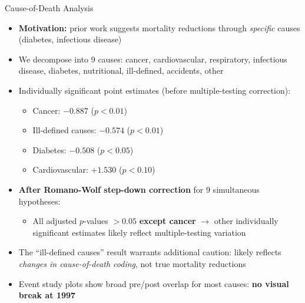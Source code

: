 \documentclass[aspectratio=169,usenames,dvipsnames]{beamer}
\newcommand{\smallcite}[1]{{\footnotesize\textcolor{Blue}{\citep{#1}}}}
\begin{document}

\begin{frame}{Cause-of-Death Analysis}\label{cod}
\small
\begin{itemize}
  \item[$\circ$] \textbf{Motivation:} prior work suggests mortality reductions through \textit{specific} causes (diabetes, infectious disease) \smallcite{BarhamRowberry2013JDE}
  \vspace{4pt}
  \item[$\circ$] We decompose into 9 causes: cancer, cardiovascular, respiratory, infectious disease, diabetes, nutritional, ill-defined, accidents, other
  \vspace{4pt}
  \item[$\circ$] Individually significant point estimates (before multiple-testing correction):
    \begin{itemize}
      \item \textcolor{blue1}{Cancer}: $-0.887$ ($p<0.01$)
      \item \textcolor{blue1}{Ill-defined causes}: $-0.574$ ($p<0.01$)
      \item \textcolor{blue1}{Diabetes}: $-0.508$ ($p<0.05$)
      \item \textcolor{redUT}{Cardiovascular}: $+1.530$ ($p<0.10$)
    \end{itemize}
  \vspace{4pt}
  \item[$\circ$] \textbf{After Romano-Wolf step-down correction} for 9 simultaneous hypotheses:
    \begin{itemize}
      \item All adjusted $p$-values $> 0.05$ \textbf{except cancer} $\to$ other individually significant estimates likely reflect multiple-testing variation
    \end{itemize}
  \vspace{4pt}
  \item[$\circ$] The ``ill-defined causes'' result warrants additional caution: likely reflects \textit{changes in cause-of-death coding}, not true mortality reductions
  \vspace{4pt}
  \item[$\circ$] Event study plots show broad pre/post overlap for most causes: \textbf{no visual break at 1997}
\end{itemize}
\end{frame}
\end{document}
